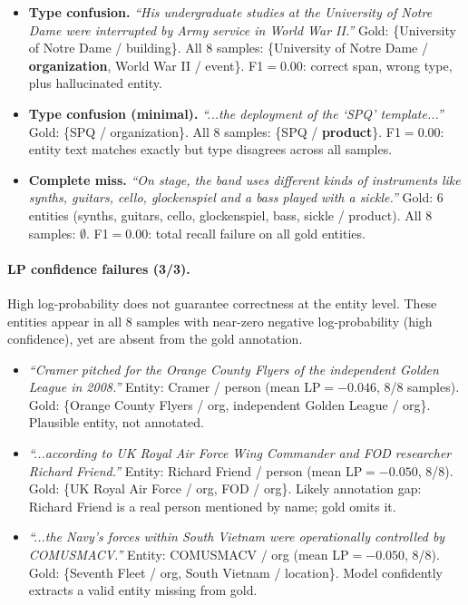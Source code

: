 \begin{itemize}[nosep,leftmargin=*]
\item \textbf{Type confusion.} \textit{``His undergraduate studies at the University of Notre Dame were interrupted by Army service in World War II.''} Gold: \{University of Notre Dame / building\}. All 8 samples: \{University of Notre Dame / \textbf{organization}, World War II / event\}. F1${=}0.00$: correct span, wrong type, plus hallucinated entity.

\item \textbf{Type confusion (minimal).} \textit{``...the deployment of the `SPQ' template...''} Gold: \{SPQ / organization\}. All 8 samples: \{SPQ / \textbf{product}\}. F1${=}0.00$: entity text matches exactly but type disagrees across all samples.

\item \textbf{Complete miss.} \textit{``On stage, the band uses different kinds of instruments like synths, guitars, cello, glockenspiel and a bass played with a sickle.''} Gold: 6 entities (synths, guitars, cello, glockenspiel, bass, sickle / product). All 8 samples: $\emptyset$. F1${=}0.00$: total recall failure on all gold entities.
\end{itemize}

\paragraph{LP confidence failures (3/3).}
High log-probability does not guarantee correctness at the entity level. These entities appear in all 8 samples with near-zero negative log-probability (high confidence), yet are absent from the gold annotation.

\begin{itemize}[nosep,leftmargin=*]
\item \textit{``Cramer pitched for the Orange County Flyers of the independent Golden League in 2008.''} Entity: Cramer / person (mean LP${=}{-}0.046$, 8/8 samples). Gold: \{Orange County Flyers / org, independent Golden League / org\}. Plausible entity, not annotated.

\item \textit{``...according to UK Royal Air Force Wing Commander and FOD researcher Richard Friend.''} Entity: Richard Friend / person (mean LP${=}{-}0.050$, 8/8). Gold: \{UK Royal Air Force / org, FOD / org\}. Likely annotation gap: Richard Friend is a real person mentioned by name; gold omits it.

\item \textit{``...the Navy's forces within South Vietnam were operationally controlled by COMUSMACV.''} Entity: COMUSMACV / org (mean LP${=}{-}0.050$, 8/8). Gold: \{Seventh Fleet / org, South Vietnam / location\}. Model confidently extracts a valid entity missing from gold.
\end{itemize}

